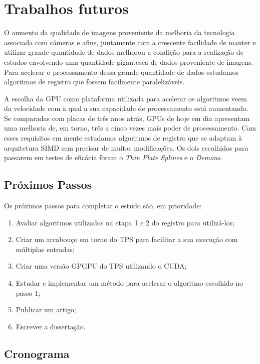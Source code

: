 \chapter{Trabalhos futuros}
\label{cap:conclusoes}

	O aumento da qualidade de imagens proveniente da melhoria da tecnologia associada com câmeras e afins, juntamente com
a crescente facilidade de manter e utilizar grande quantidade de dados melhorou a condição para a realização de estudos
envolvendo uma quantidade gigantesca de dados proveniente de imagens. Para acelerar o processamento dessa
grande quantidade de dados estudamos algoritmos de registro que fossem facilmente paralelizáveis.

	A escolha da GPU como plataforma utilizada para acelerar os algoritmos veem da velocidade com a qual a sua capacidade
de processamento está aumentando. Se comparadas com placas de três anos atrás, GPUs de hoje em dia apresentam uma melhoria
de, em torno, três a cinco vezes mais poder de processamento. Com esses requisitos em mente estudamos algoritmos de registro
que se adaptam à arquitetura SIMD sem precisar de muitas modificações. Os dois escolhidos para passarem em testes de
eficácia foram o \textit{Thin Plate Splines} e o \textit{Demons}.
\section{Próximos Passos} 

	Os próximos passos para completar o estudo são, em prioridade:
\begin{enumerate}
	\item Avaliar algoritmos utilizados na etapa 1 e 2 do registro para utilizá-los;
	\item Criar um arcabouço em torno do TPS para facilitar a sua execução com múltiplas entradas;
	\item Criar uma versão GPGPU do TPS utilizando o CUDA;
	\item Estudar e implementar um método para acelerar o algoritmo escolhido no passo 1;
	\item Publicar um artigo;
	\item Escrever a dissertação.
\end{enumerate}

\section{Cronograma}

